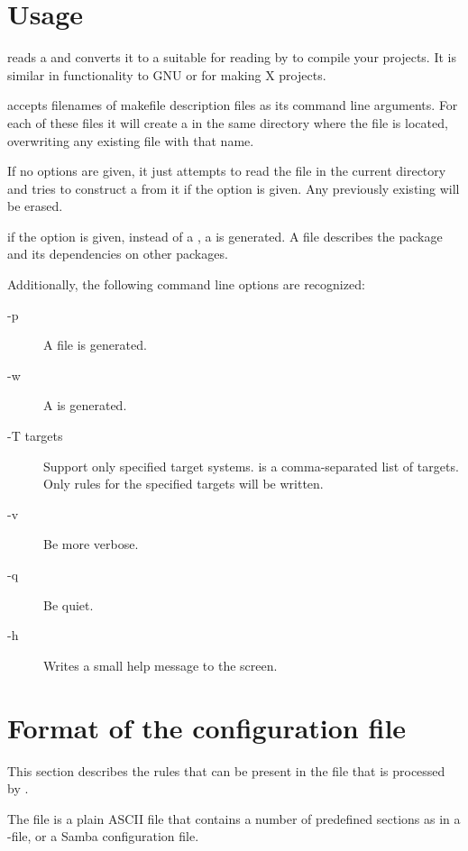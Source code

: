 \section{Usage}
 reads a  and converts it to a
 suitable for reading by \gnu {}
to compile your projects. It is similar in functionality to GNU
 or  for making X projects.

\fpcmake{} accepts filenames of makefile description files
as its command line arguments. For each of these files it will
create a  in the same directory where the file is
located, overwriting any existing file with that name.

If no options are given, it just attempts to read the file
 in the current directory and tries to
construct a  from it if the  option is
given. Any previously existing  will be erased.

if the  option is given, instead of a , a
 is generated. A  file describes the
package and its dependencies on other packages.

Additionally, the following command line options are recognized:
\begin{description}
\item[-p] A  file is generated.
\item[-w] A  is generated.
\item[-T targets] Support only specified target systems.  is a
comma-separated list of targets. Only rules for the specified targets
will be written.
\item[-v] Be more verbose.
\item[-q] Be quiet.
\item[-h] Writes a small help message to the screen.
\end{description}

\section{Format of the configuration file}
This section describes the rules that can be present in the file
that is processed by \fpcmake{}.

The file  is a plain ASCII file that contains
a number of predefined sections as in a \windows {}-file,
or a Samba configuration file.

